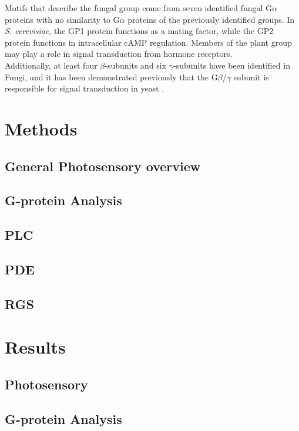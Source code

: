 \indent Motifs that describe the fungal group come from seven identified fungal G$\alpha$ proteins with no similarity to G$\alpha$ proteins of the previously identified groups. In \textit{S. cerevisiae}, the GP1 protein functions as a mating factor, while the GP2 protein functions in intracellular cAMP regulation. Members of the plant group may play a role in signal transduction from hormone receptors.\\
\indent Additionally, at least four $\beta$-subunits and six $\gamma$-subunits have been identified \cite{Hepler1992} in Fungi, and it has been demonstrated previously that the G$\beta$/$\gamma$ subunit is responsible for signal transduction in yeast \cite{Bolker1998}.\\
\section{Methods}
\subsection{General Photosensory overview}
\subsection{G-protein Analysis}
\subsection{PLC}
\subsection{PDE}
\subsection{RGS}
\section{Results}
\subsection{Photosensory}
\subsection{G-protein Analysis}
